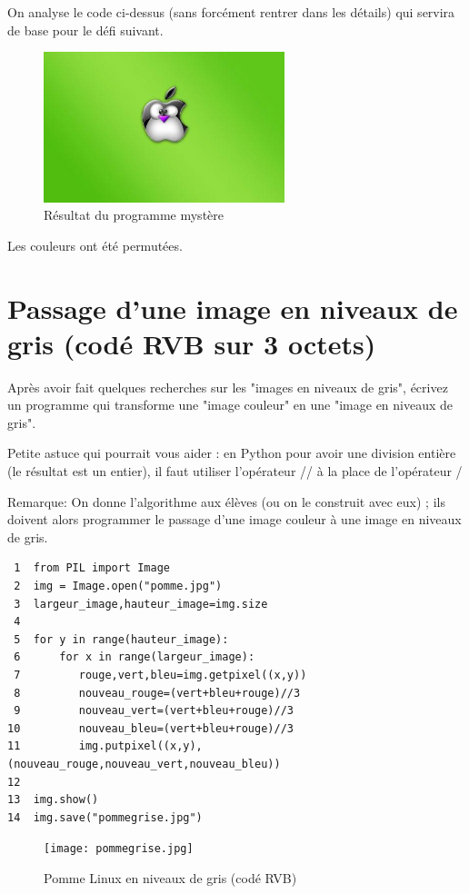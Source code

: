 \documentclass[11pt]{article}
\begin{document}
On analyse le code ci-dessus (sans forcément rentrer dans les détails) qui servira de base pour le défi suivant.

\begin{figure}[htbp]
\centering
\includegraphics[width=7cm]{pommeMystere.jpg}
\caption{Résultat du programme mystère}
\end{figure}

Les couleurs ont été permutées.


\section{Passage d'une image en niveaux de gris (codé RVB sur 3 octets)}
\label{sec:orgbaba77f}

Après avoir fait quelques recherches sur les "images en niveaux de gris", écrivez un programme qui transforme une "image couleur" en une "image en niveaux de gris".

Petite astuce qui pourrait vous aider : en Python pour avoir une division entière (le résultat est un entier), il faut utiliser l'opérateur // à la place de l'opérateur / 

Remarque: On donne l'algorithme aux élèves (ou on le construit avec eux) ; ils doivent alors programmer le passage d'une image couleur à une image en niveaux de gris.


\begin{verbatim}
 1  from PIL import Image
 2  img = Image.open("pomme.jpg")
 3  largeur_image,hauteur_image=img.size
 4  
 5  for y in range(hauteur_image):
 6      for x in range(largeur_image):
 7         rouge,vert,bleu=img.getpixel((x,y))
 8         nouveau_rouge=(vert+bleu+rouge)//3
 9         nouveau_vert=(vert+bleu+rouge)//3
10         nouveau_bleu=(vert+bleu+rouge)//3
11         img.putpixel((x,y),(nouveau_rouge,nouveau_vert,nouveau_bleu))
12  
13  img.show()
14  img.save("pommegrise.jpg")
\end{verbatim}

\begin{figure}[htbp]
\centering
\texttt{[image: pommegrise.jpg]}
\caption{Pomme Linux en niveaux de gris (codé RVB)}
\end{figure}
\end{document}
